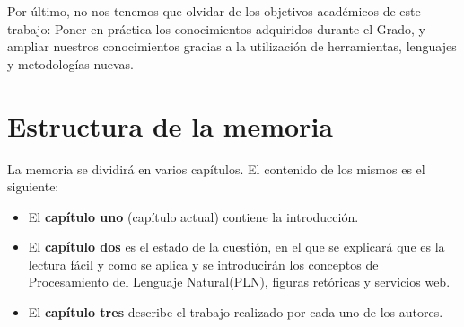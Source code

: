 Por último, no nos tenemos que olvidar de los objetivos académicos de este trabajo: Poner en práctica los conocimientos adquiridos durante el Grado, y ampliar nuestros conocimientos gracias a la utilización de herramientas, lenguajes y metodologías nuevas.
	
\section{Estructura de la memoria}

La memoria se dividirá en varios capítulos. El contenido de los mismos es el siguiente:
\begin{itemize}
	\item El \textbf{capítulo uno} (capítulo actual) contiene la introducción.
	\item El \textbf{capítulo dos} es el estado de la cuestión, en el que se explicará que es la lectura fácil y como se aplica y se introducirán los conceptos de Procesamiento del Lenguaje Natural(PLN), figuras retóricas y servicios web.
	\item El \textbf{capítulo tres} describe el trabajo realizado por cada uno de los autores.
\end{itemize}